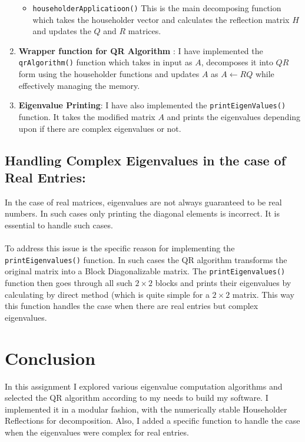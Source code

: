 \documentclass{article}
\begin{document}
\begin{enumerate}
\begin{itemize}
        \item \texttt{householderApplicatioon()} This is the main decomposing function which takes the householder vector and calculates the reflection matrix $H$ and updates the $Q$ and $R$ matrices.
    \end{itemize}
    \item \textbf{Wrapper function for QR Algorithm} : I have implemented the \texttt{qrAlgorithm()} function which takes in input as $A$, decomposes it into $QR$ form using the householder functions and updates $A$ as $A \leftarrow R Q$ while effectively managing the memory.
    \item \textbf{Eigenvalue Printing}: I have also implemented the \texttt{printEigenValues()} function. It takes the modified matrix $A$ and prints the eigenvalues depending upon if there are complex eigenvalues or not.
\end{enumerate}

\subsection{Handling Complex Eigenvalues in the case of Real Entries:} \cite{libretexts}
In the case of real matrices, eigenvalues are not always guaranteed to be real numbers. In such cases only printing the diagonal elements is incorrect. It is essential to handle such cases.
\paragraph{} To address this issue is the specific reason for implementing the \texttt{printEigenvalues()} function. In such cases the QR algorithm transforms the original matrix into a Block Diagonalizable matrix. The \texttt{printEigenvalues()} function then goes through all such $2\times2$ blocks and prints their eigenvalues by calculating by direct method (which is quite simple for a $2\times2$ matrix. This way this function handles the case when there are real entries but complex eigenvalues.

\section{Conclusion}
In this assignment I explored various eigenvalue computation algorithms and selected the QR algorithm according to my needs to build my software. I implemented it in a modular fashion, with the numerically stable Householder Reflections for decomposition. Also, I added a specific function to handle the case when the eigenvalues were complex for real entries. 




\end{document}
